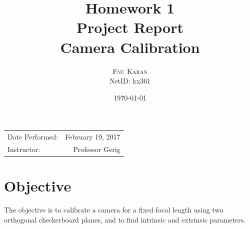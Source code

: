\documentclass{article}
\title{Homework 1 \\ Project Report \\ Camera Calibration} %
\author{\textsc{Fnu Karan} \\ NetID: kx361} %
\date{\today} %
\begin{document}
\maketitle %

\begin{center}
\begin{tabular}{l r}
Date Performed: & February 19, 2017 \\ %
Instructor: & Professor Gerig %
\end{tabular}
\end{center}



\section{Objective}

The objective is to calibrate a camera for a fixed focal length using two orthogonal checkerboard planes, and to find intrinsic and extrinsic parameters.



 
\end{document}
